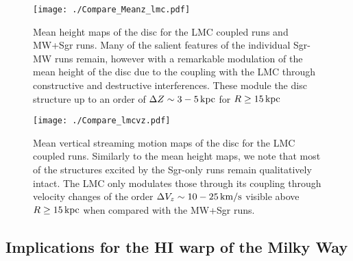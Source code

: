 \documentclass[useAMS,usenatbib]{mnras}
\begin{document}
{%


\begin{figure}
\texttt{[image: ./Compare\_Meanz\_lmc.pdf]}
\caption[]{Mean height maps of the disc for the LMC coupled runs and MW+Sgr runs. Many of the salient features of the individual Sgr-MW runs remain, however with a remarkable modulation of the mean height of the disc due to the coupling with the LMC through constructive and destructive interferences. These module the disc structure up to an order of $\Delta Z\sim3-5\,\rm{kpc}$ for $R\geq15\,\rm{kpc}$ }
\end{figure}


\begin{figure}
\texttt{[image: ./Compare\_lmcvz.pdf]}
\caption[]{Mean vertical streaming motion maps of the disc for the LMC coupled runs. Similarly to the mean height maps, we note that most of the structures excited by the Sgr-only runs remain qualitatively intact. The LMC only modulates those through its coupling through velocity changes of the order $\Delta V_{z}\sim10-25\,\rm{km/s}$ visible above $R\geq15\,\rm{kpc}$ when compared with the MW+Sgr runs. }
\end{figure}

\subsection{Implications for the HI warp of the Milky Way}

}
\end{document}
